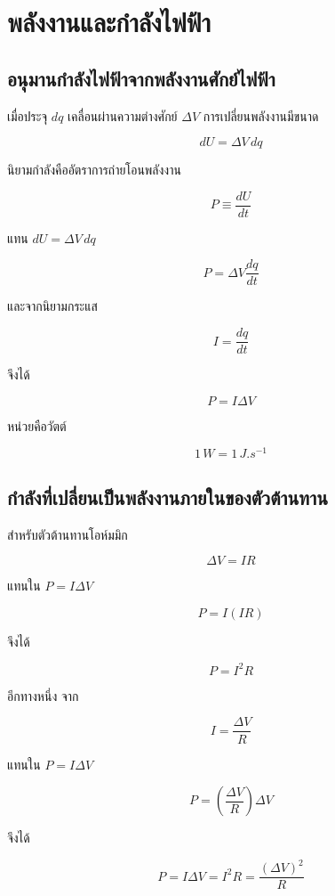 \section{พลังงานและกำลังไฟฟ้า}

\subsection{อนุมานกำลังไฟฟ้าจากพลังงานศักย์ไฟฟ้า}

เมื่อประจุ $dq$ เคลื่อนผ่านความต่างศักย์ $\Delta V$ การเปลี่ยนพลังงานมีขนาด

\[
dU=\Delta V\,dq
\]

นิยามกำลังคืออัตราการถ่ายโอนพลังงาน

\[
P\equiv\frac{dU}{dt}
\]

แทน $dU=\Delta V\,dq$

\[
P=\Delta V\frac{dq}{dt}
\]

และจากนิยามกระแส

\[
I=\frac{dq}{dt}
\]

จึงได้

\begin{tcolorbox}[title={กำลังไฟฟ้า}]
\[
\boxed{P=I\Delta V}
\]
\end{tcolorbox}

หน่วยคือวัตต์

\[
1\,\si{W}=1\,\si{J.s^{-1}}
\]

\subsection{กำลังที่เปลี่ยนเป็นพลังงานภายในของตัวต้านทาน}

สำหรับตัวต้านทานโอห์มมิก

\[
\Delta V=IR
\]

แทนใน $P=I\Delta V$

\[
P=I(IR)
\]

จึงได้

\[
\boxed{P=I^2R}
\]

อีกทางหนึ่ง จาก

\[
I=\frac{\Delta V}{R}
\]

แทนใน $P=I\Delta V$

\[
P=\left(\frac{\Delta V}{R}\right)\Delta V
\]

จึงได้

\begin{tcolorbox}[title={กำลังที่ตัวต้านทานรับ}]
\[
\boxed{P=I\Delta V=I^2R=\frac{(\Delta V)^2}{R}}
\]
\end{tcolorbox}

